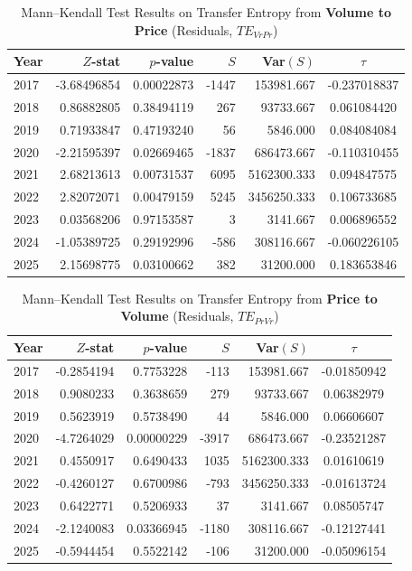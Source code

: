 \documentclass{elsarticle}
\def\rightarrow{}%
\begin{document}
\begin{table}[H]
  \caption{Mann--Kendall Test Results on Transfer Entropy from \textbf{Volume to Price} (Residuals, $TE_{Vr \rightarrow Pr}$)}
  \label{tab:MK_Volr2ValrTE}
  \centering
  \begin{tabular}{lrrrrc}
    \hline
    Year & $Z$-stat & $p$-value & $S$ & Var$(S)$ & $\tau$ \\
    \hline
    2017 & -3.68496854 & 0.00022873 & -1447 & 153981.667 & -0.237018837 \\
    2018 &  0.86882805 & 0.38494119 &   267 &  93733.667 &  0.061084420 \\
    2019 &  0.71933847 & 0.47193240 &    56 &   5846.000 &  0.084084084 \\
    2020 & -2.21595397 & 0.02669465 & -1837 & 686473.667 & -0.110310455 \\
    2021 &  2.68213613 & 0.00731537 &  6095 & 5162300.333 &  0.094847575 \\
    2022 &  2.82072071 & 0.00479159 &  5245 & 3456250.333 &  0.106733685 \\
    2023 &  0.03568206 & 0.97153587 &     3 &   3141.667 &  0.006896552 \\
    2024 & -1.05389725 & 0.29192996 &  -586 &  308116.667 & -0.060226105 \\
    2025 &  2.15698775 & 0.03100662 &   382 &   31200.000 &  0.183653846 \\
    \hline
  \end{tabular}
\end{table}

\begin{table}[H]
  \caption{Mann--Kendall Test Results on Transfer Entropy from \textbf{Price to Volume} (Residuals, $TE_{Pr \rightarrow Vr}$)}
  \label{tab:MK_Valr2VolrTE}
  \centering
  \begin{tabular}{lrrrrc}
    \hline
    Year & $Z$-stat & $p$-value & $S$ & Var$(S)$ & $\tau$ \\
    \hline
    2017 & -0.2854194 & 0.7753228 &  -113 & 153981.667 & -0.01850942 \\
    2018 &  0.9080233 & 0.3638659 &   279 &  93733.667 &  0.06382979 \\
    2019 &  0.5623919 & 0.5738490 &    44 &   5846.000 &  0.06606607 \\
    2020 & -4.7264029 & 0.00000229 & -3917 & 686473.667 & -0.23521287 \\
    2021 &  0.4550917 & 0.6490433 &  1035 & 5162300.333 &  0.01610619 \\
    2022 & -0.4260127 & 0.6700986 &  -793 & 3456250.333 & -0.01613724 \\
    2023 &  0.6422771 & 0.5206933 &    37 &   3141.667 &  0.08505747 \\
    2024 & -2.1240083 & 0.03366945 & -1180 &  308116.667 & -0.12127441 \\
    2025 & -0.5944454 & 0.5522142 &  -106 &   31200.000 & -0.05096154 \\
    \hline
  \end{tabular}
\end{table}
\end{document}
